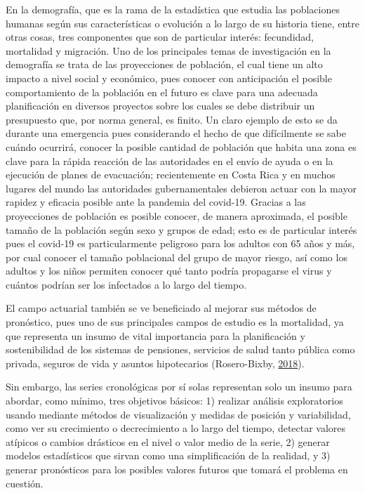 \documentclass[
]{article}
\begin{document}
En la demografía, que es la rama de la estadística que estudia las
poblaciones humanas según sus características o evolución a lo largo de
su historia tiene, entre otras cosas, tres componentes que son de
particular interés: fecundidad, mortalidad y migración. Uno de los
principales temas de investigación en la demografía se trata de las
proyecciones de población, el cual tiene un alto impacto a nivel social
y económico, pues conocer con anticipación el posible comportamiento de
la población en el futuro es clave para una adecuada planificación en
diversos proyectos sobre los cuales se debe distribuir un presupuesto
que, por norma general, es finito. Un claro ejemplo de esto se da
durante una emergencia pues considerando el hecho de que difícilmente se
sabe cuándo ocurrirá, conocer la posible cantidad de población que
habita una zona es clave para la rápida reacción de las autoridades en
el envío de ayuda o en la ejecución de planes de evacuación;
recientemente en Costa Rica y en muchos lugares del mundo las
autoridades gubernamentales debieron actuar con la mayor rapidez y
eficacia posible ante la pandemia del covid-19. Gracias a las
proyecciones de población es posible conocer, de manera aproximada, el
posible tamaño de la población según sexo y grupos de edad; esto es de
particular interés pues el covid-19 es particularmente peligroso para
los adultos con 65 años y más, por cual conocer el tamaño poblacional
del grupo de mayor riesgo, así como los adultos y los niños permiten
conocer qué tanto podría propagarse el virus y cuántos podrían ser los
infectados a lo largo del tiempo.

El campo actuarial también se ve beneficiado al mejorar sus métodos de
pronóstico, pues uno de sus principales campos de estudio es la
mortalidad, ya que representa un insumo de vital importancia para la
planificación y sostenibilidad de los sistemas de pensiones, servicios
de salud tanto pública como privada, seguros de vida y asuntos
hipotecarios (Rosero-Bixby, \protect\hyperlink{ref-supenprodc}{2018}).

Sin embargo, las series cronológicas por sí solas representan solo un
insumo para abordar, como mínimo, tres objetivos básicos: 1) realizar
análisis exploratorios usando mediante métodos de visualización y
medidas de posición y variabilidad, como ver su crecimiento o
decrecimiento a lo largo del tiempo, detectar valores atípicos o cambios
drásticos en el nivel o valor medio de la serie, 2) generar modelos
estadísticos que sirvan como una simplificación de la realidad, y 3)
generar pronósticos para los posibles valores futuros que tomará el
problema en cuestión.
\end{document}
